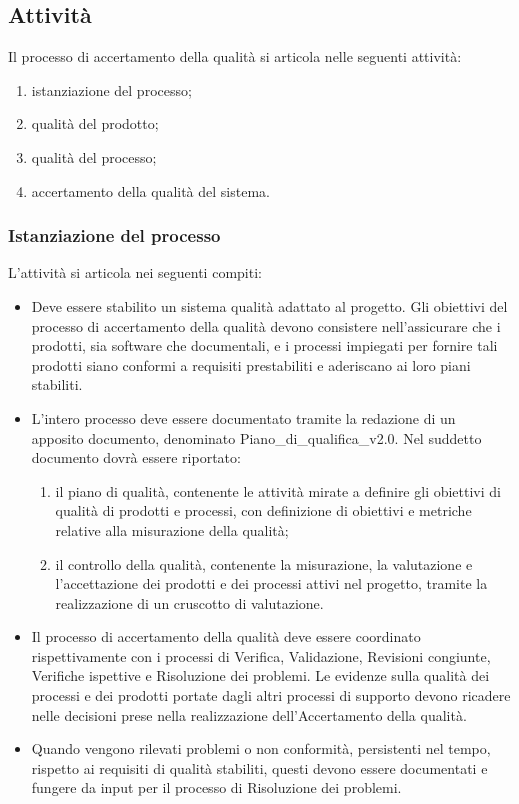 \subsection{Attività}
Il processo di accertamento della qualità si articola nelle seguenti attività:
\begin{enumerate}
    \item istanziazione del processo;
    \item qualità del prodotto;
    \item qualità del processo;
    \item accertamento della qualità del sistema.
\end{enumerate}
\subsubsection{Istanziazione del processo}
L'attività si articola nei seguenti compiti:
\begin{itemize}
    \item Deve essere stabilito un sistema qualità adattato al progetto. Gli obiettivi del processo di accertamento della qualità devono consistere nell'assicurare che i prodotti, sia software che documentali, e i processi impiegati per fornire tali prodotti siano conformi a requisiti prestabiliti e aderiscano ai loro piani stabiliti.
    \item L'intero processo deve essere documentato tramite la redazione di un apposito documento, denominato Piano\_di\_qualifica\_v2.0. Nel suddetto documento dovrà essere riportato:
    \begin{enumerate}
        \item il piano di qualità, contenente le attività mirate a definire gli obiettivi di qualità di prodotti e processi, con definizione di obiettivi e metriche relative alla misurazione della qualità;
        \item il controllo della qualità, contenente la misurazione, la valutazione e l'accettazione dei prodotti e dei processi attivi nel progetto, tramite la realizzazione di un cruscotto di valutazione.
    \end{enumerate}
    
    \item Il processo di accertamento della qualità deve essere coordinato rispettivamente con i processi di Verifica, Validazione, Revisioni congiunte, Verifiche ispettive e Risoluzione dei problemi. Le evidenze sulla qualità dei processi e dei prodotti portate dagli altri processi di supporto devono ricadere nelle decisioni prese nella realizzazione dell'Accertamento della qualità.
    \item Quando vengono rilevati problemi o non conformità, persistenti nel tempo, rispetto ai requisiti di qualità stabiliti, questi devono essere documentati e fungere da input per il processo di Risoluzione dei problemi.
\end{itemize}


